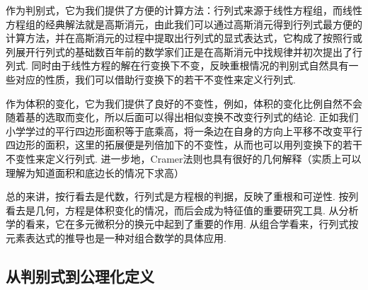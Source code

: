 作为判别式，它为我们提供了方便的计算方法：行列式来源于线性方程组，而线性方程组的经典解法就是高斯消元，由此我们可以通过高斯消元得到行列式最方便的计算方法，并在高斯消元的过程中提取出行列式的显式表达式，它构成了按照行或列展开行列式的基础数百年前的数学家们正是在高斯消元中找规律并初次提出了行列式. 同时由于线性方程的解在行变换下不变，反映重根情况的判别式自然具有一些对应的性质，我们可以借助行变换下的若干不变性来定义行列式.

作为体积的变化，它为我们提供了良好的不变性，例如，体积的变化比例自然不会随着基的选取而变化，所以后面可以得出相似变换不改变行列式的结论. 正如我们小学学过的平行四边形面积等于底乘高，将一条边在自身的方向上平移不改变平行四边形的面积，这里的拓展便是列倍加下的不变性，从而也可以用列变换下的若干不变性来定义行列式. 进一步地，Cramer法则也具有很好的几何解释（实质上可以理解为知道面积和底边长的情况下求高）

总的来讲，按行看去是代数，行列式是方程根的判据，反映了重根和可逆性. 按列看去是几何，方程是体积变化的情况，而后会成为特征值的重要研究工具. 从分析学的看来，它在多元微积分的换元中起到了重要的作用. 从组合学看来，行列式按元素表达式的推导也是一种对组合数学的具体应用.

\subsection{从判别式到公理化定义}

